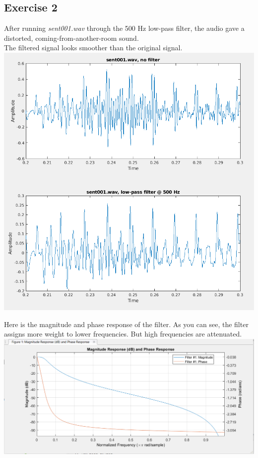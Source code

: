 \documentclass[11pt]{article}
\begin{document}
\subsection{Exercise 2}

After running \textit{sent001.wav} through the 500 Hz low-pass filter, the audio gave a distorted, coming-from-another-room sound.\\

The filtered signal looks smoother than the original signal.\\



\includegraphics[width=\textwidth]{exercise2.png}

Here is the magnitude and phase response of the filter.
As you can see, the filter assigns more weight to lower frequencies.
But high frequencies are attenuated.\\

\includegraphics[width=\textwidth]{low_pass_filter_response.png}
\end{document}
